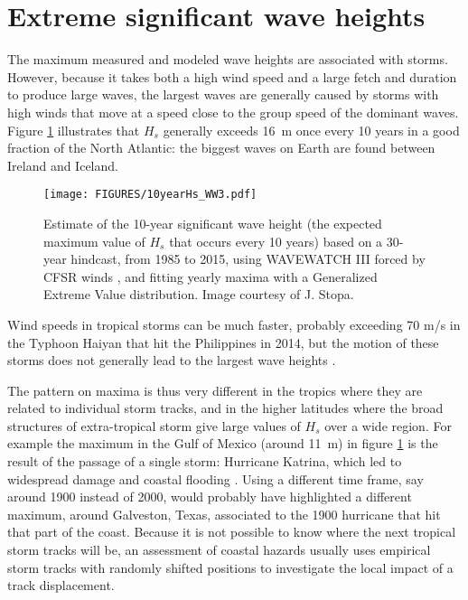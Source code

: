 \section{Extreme significant wave heights}
The maximum measured and modeled wave heights are associated with storms. However, because it takes both a high wind speed 
and a large fetch and duration to produce large waves, the largest waves are generally caused by storms with high winds that move 
at a speed close to the group speed of the dominant waves. Figure \ref{fig:10yearHsWW3} illustrates that $H_s$ generally exceeds 16~m once 
every 10 years in a good fraction of the North Atlantic: the biggest waves on Earth are found between Ireland and Iceland. 

\begin{figure}[htb]
\centerline{\texttt{[image: FIGURES/10yearHs\_WW3.pdf]}}
  \caption{Estimate of the 10-year significant wave height (the expected maximum value of $H_s$ that occurs every 10 years) based on a 
  30-year hindcast, from 1985 to 2015, using WAVEWATCH III forced by CFSR winds \cite{Saha&al.2010}, and fitting yearly maxima with a Generalized Extreme Value distribution. Image courtesy of J. Stopa.}
  \label{fig:10yearHsWW3}
\end{figure}
Wind speeds in tropical storms can be much faster, probably exceeding 70 m/s in the Typhoon Haiyan that hit the Philippines in 2014, but
the motion of these storms does not generally lead to the largest wave heights \citep[see also][]{Quilfen&al.2010}. 

The pattern on maxima is thus very different in the tropics where they are related to individual storm tracks, and in the 
higher latitudes where the broad structures of extra-tropical storm give large values of $H_s$ over a wide region. 
For example the maximum in the Gulf of Mexico (around 11~m) in figure \ref{fig:10yearHsWW3} is the result of the passage of a 
single storm: Hurricane Katrina, which led to widespread damage and coastal flooding \citep[e.g.][]{Resio&Westerink2008}. 
Using a different time frame, say around 1900 instead of 2000, would probably have highlighted a different maximum, around Galveston, Texas, 
associated to the 1900 hurricane that hit that part of the coast. 
Because it is not possible to know where the next tropical storm tracks will be, an assessment of coastal hazards usually uses 
empirical storm tracks with randomly shifted positions to investigate the local impact of a track displacement. 

